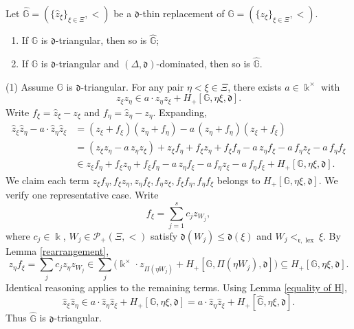 \documentclass[10pt,a4paper]{amsart}
\makeatletter
\newcommand{\GG}{\mathbb{G}}
\newcommand{\dd}{\mathfrak{d}}
\DeclareMathOperator{\lex}{lex}
\renewenvironment{proof}[1][\proofname]{\par
	\pushQED{\qed}%
	\normalfont \topsep6\p@\@plus6\p@\relax
	\trivlist
	\item[\hskip\labelsep
	\bfseries
	#1\@addpunct{.}]\ignorespaces
}{%
	\popQED\endtrivlist\@endpefalse
}
\newcommand{\rr}{\mathfrak{r}}
\makeatother
\begin{document}
	\begin{prop}\label{proposition of replacement}
		Let $\hat{\GG}=(\{\hat{z}_{\xi}\}_{\xi\in \Xi}, <)$ be a $\dd$-thin replacement of  $\GG=(\{z_{\xi}\}_{\xi\in \Xi}, <)$.
		\begin{enumerate}
			\item If $\GG$ is $\dd$-triangular, then so is $\hat{\GG}$;
			\item If $\GG$ is $\dd$-triangular and $(\Delta,\dd)$-dominated, then so is $\hat{\GG}$.
		\end{enumerate}
	\end{prop}

	\begin{proof}
		(1) Assume $\GG$ is $\dd$-triangular. For any pair $\eta<\xi\in\Xi$, there exists $a\in \Bbbk^{\times}$ with
		\[
		z_\xi z_\eta \in a\cdot z_\eta z_\xi + H_{+}[\GG,\eta\xi,\dd].
		\]
		Write $f_{\xi} = \hat{z}_{\xi} -z_{\xi}$ and $f_{\eta} = \hat{z}_{\eta} -z_{\eta}$. Expanding,
		\[
		\begin{aligned}
			\hat{z}_\xi\hat{z}_\eta - a\cdot\hat{z}_\eta\hat{z}_\xi
			&= (z_\xi+f_\xi)(z_\eta+f_\eta) - a\,(z_\eta+f_\eta)(z_\xi+f_\xi) \\
			&= (z_\xi z_\eta - a\,z_\eta z_\xi)
			+ z_\xi f_\eta + f_\xi z_\eta + f_\xi f_\eta
			- a\,z_\eta f_\xi - a\,f_\eta z_\xi - a\,f_\eta f_\xi \\
			&\in z_\xi f_\eta + f_\xi z_\eta + f_\xi f_\eta
			- a\,z_\eta f_\xi - a\,f_\eta z_\xi - a\,f_\eta f_\xi + H_{+}[\GG,\eta\xi,\dd].
		\end{aligned}
		\]
		We claim each term $z_\xi f_\eta, f_\xi z_\eta, z_\eta f_\xi, f_\eta z_\xi, f_\xi f_\eta, f_\eta f_\xi$ belongs to $H_{+}[\GG,\eta\xi,\dd]$. We verify one representative case. Write
		$$f_\xi=\sum_{j=1}^{s} c_j z_{W_j},$$
		where $c_{j}\in \Bbbk$, $W_{j} \in \mathcal{P}_{+}(\Xi, <)$ satisfy $\dd(W_{j}) \leq \dd(\xi)$ and $W_{j} <_{\rr,\lex} \xi$. By Lemma \ref{rearrangement},
		\[
		z_\eta f_\xi = \sum_j c_j z_\eta z_{W_j}
		\in \sum_{j} \bigl(\Bbbk^\times\!\cdot\! z_{\Pi(\eta W_j)}
		+ H_{+}[\GG,\Pi(\eta W_j),\dd]\bigr)
		\subseteq H_{+}[\GG,\eta\xi,\dd].
		\]
		Identical reasoning applies to the remaining terms. Using Lemma \ref{equality of H},
		\[
		\hat{z}_\xi\hat{z}_\eta \in a\cdot\hat{z}_\eta\hat{z}_\xi
		+ H_{+}[\GG,\eta\xi,\dd]= a\cdot\hat{z}_\eta\hat{z}_\xi
		+ H_{+}[\hat{\GG},\eta\xi,\dd].
		\]
		Thus $\hat{\GG}$ is $\dd$-triangular.
		

\end{proof}
\end{document}
